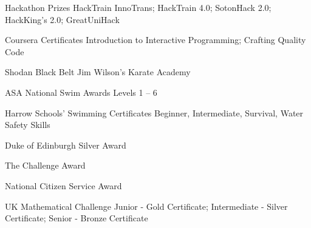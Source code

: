 



\begin{cvhonors}

  \cvhonor
    {Hackathon Prizes} %
    {HackTrain InnoTrans; HackTrain 4.0; SotonHack 2.0; HackKing’s 2.0; GreatUniHack} %
    {} %
    {} %
    
  \cvhonor
    {Coursera Certificates} %
    {Introduction to Interactive Programming; Crafting Quality Code} %
    {} %
    {} %
    
  \cvhonor
    {Shodan Black Belt} %
    {Jim Wilson’s Karate Academy} %
    {} %
    {} %
    
  \cvhonor
    {ASA National Swim Awards} %
    {Levels 1 – 6} %
    {} %
    {} %

  \cvhonor
    {Harrow Schools’ Swimming Certificates} %
    {Beginner, Intermediate, Survival, Water Safety Skills} %
    {} %
    {} %

  \cvhonor
    {Duke of Edinburgh Silver Award} %
    {} %
    {} %
    {} %
    
  \cvhonor
    {The Challenge Award} %
    {} %
    {} %
    {} %
    
  \cvhonor
    {National Citizen Service Award} %
    {} %
    {} %
    {} %

  \cvhonor
    {UK Mathematical Challenge} %
    {Junior - Gold Certificate; Intermediate - Silver Certificate; Senior - Bronze Certificate} %
    {} %
    {} %

\end{cvhonors}